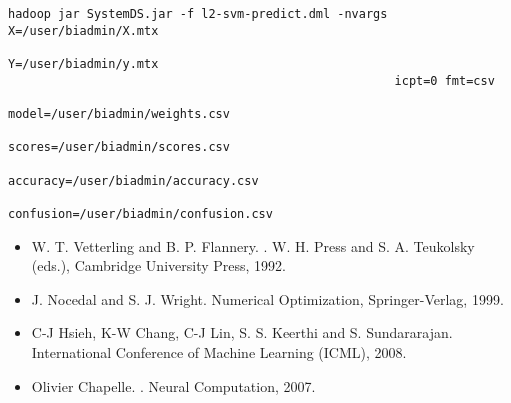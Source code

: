 \begin{verbatim}
hadoop jar SystemDS.jar -f l2-svm-predict.dml -nvargs X=/user/biadmin/X.mtx 
                                                      Y=/user/biadmin/y.mtx 
                                                      icpt=0 fmt=csv
                                                      model=/user/biadmin/weights.csv
                                                      scores=/user/biadmin/scores.csv
                                                      accuracy=/user/biadmin/accuracy.csv
                                                      confusion=/user/biadmin/confusion.csv
\end{verbatim}


\begin{itemize}
\item W. T. Vetterling and B. P. Flannery. . \newblock W. H. Press and S. A. Teukolsky
(eds.), Cambridge University Press, 1992.
\item J. Nocedal and  S. J. Wright. Numerical Optimization, Springer-Verlag, 1999.
\item C-J Hsieh, K-W Chang, C-J Lin, S. S. Keerthi and S. Sundararajan.  \newblock International Conference of Machine Learning
(ICML), 2008.
\item Olivier Chapelle. . \newblock Neural 
Computation, 2007.
\end{itemize}

